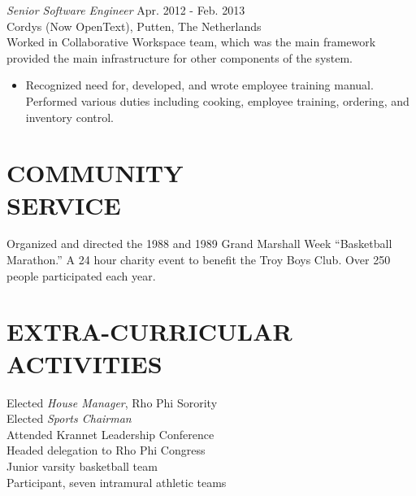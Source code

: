 \documentclass[margin]{res}
\begin{document}
\begin{resume}
		{\sl Senior Software Engineer} \hfill        Apr. 2012 - Feb. 2013  \\
		Cordys (Now OpenText), Putten, The Netherlands \\
		Worked in Collaborative Workspace team, which was the main framework provided the main infrastructure for other components of the system.  
                  \begin{itemize}
                   \item Recognized need for, developed, and wrote 
                    employee training manual. Performed various 
                    duties including cooking, employee training, 
                    ordering, and inventory control. 
                   \end{itemize} 
 
\section{COMMUNITY \\ SERVICE}  Organized and directed the 1988 and 1989 Grand 
                 Marshall Week \newline ``Basketball Marathon.'' A 24 hour 
                charity event to benefit the Troy Boys Club. Over 
                250 people participated each year. 

\section{EXTRA-CURRICULAR \\ ACTIVITIES}             
            Elected {\it House Manager}, Rho Phi Sorority \\
            Elected {\it Sports Chairman} \\
            Attended Krannet Leadership Conference \\
                Headed delegation to Rho Phi Congress \\
                Junior varsity basketball team \\
                Participant, seven intramural athletic teams 
 

\end{resume}
\end{document}

